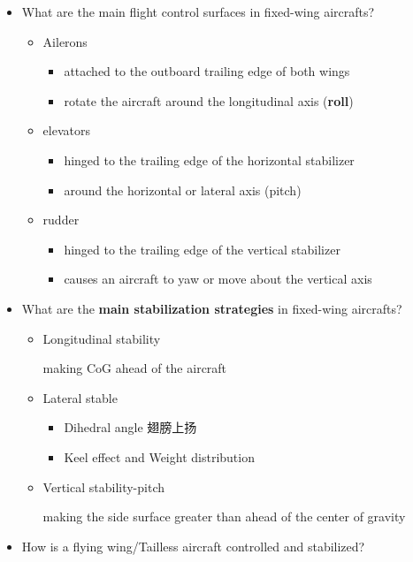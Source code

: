 \documentclass[]{article}
\begin{document}
\begin{itemize}
\item
  What are the main flight control surfaces in fixed-wing aircrafts?

  \begin{itemize}
  \item
    Ailerons

    \begin{itemize}
    \item
      attached to the outboard trailing edge of both wings
    \item
      rotate the aircraft around the longitudinal axis (\textbf{roll})
    \end{itemize}
  \item
    elevators

    \begin{itemize}
    \item
      hinged to the trailing edge of the horizontal stabilizer
    \item
      around the horizontal or lateral axis (pitch)
    \end{itemize}
  \item
    rudder

    \begin{itemize}
    \item
      hinged to the trailing edge of the vertical stabilizer
    \item
      causes an aircraft to yaw or move about the vertical axis
    \end{itemize}
  \end{itemize}
\item
  What are the \textbf{main stabilization strategies} in fixed-wing
  aircrafts?

  \begin{itemize}
  \item
    Longitudinal stability

    making CoG ahead of the aircraft
  \item
    Lateral stable

    \begin{itemize}
    \item
      Dihedral angle 翅膀上扬
    \item
      Keel effect and Weight distribution
    \end{itemize}
  \item
    Vertical stability-pitch

    making the side surface greater than ahead of the center of gravity
  \end{itemize}
\item
  How is a flying wing/Tailless aircraft controlled and stabilized?


\end{itemize}
\end{document}

